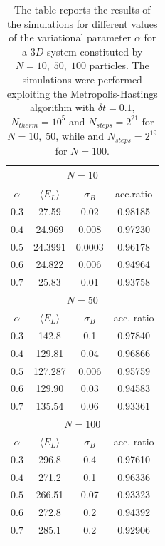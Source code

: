 \begin{table}[H]
    \centering
    \begin{tabular}{cccc}
    \toprule
        \multicolumn{4}{c}{$N=10$} \\
        \midrule
        $\alpha$ & $\langle E_L \rangle$ & $\sigma_B$ & acc.ratio \\
        \midrule
        $0.3$ & 27.59 & 0.02 & 0.98185 \\
        $0.4$ & 24.969 & 0.008 & 0.97230 \\
        $0.5$ & 24.3991 & 0.0003 & 0.96178  \\
        $0.6$ & 24.822 & 0.006 & 0.94964 \\
        $0.7$ & 25.83 & 0.01 & 0.93758 \\
        \midrule
        \midrule
        \multicolumn{4}{c}{$N=50$} \\
        \midrule
        $\alpha$ & $\langle E_L \rangle$ & $\sigma_B$ & acc. ratio \\
        \midrule
        $0.3$ & 142.8 & 0.1 & 0.97840 \\
        $0.4$ & 129.81 & 0.04 & 0.96866 \\
        $0.5$ & 127.287 & 0.006 & 0.95759 \\
        $0.6$ & 129.90 & 0.03 & 0.94583 \\
        $0.7$ & 135.54 & 0.06 & 0.93361 \\
        \midrule
        \midrule
        \multicolumn{4}{c}{$N=100$} \\
        \midrule
        $\alpha$ & $\langle E_L \rangle$ & $\sigma_B$ & acc. ratio \\
        \midrule
        $0.3$ & 296.8 & 0.4 & 0.97610 \\
        $0.4$ & 271.2 & 0.1 & 0.96336 \\
        $0.5$ & 266.51 & 0.07 &  0.93323\\
        $0.6$ & 272.8 & 0.2 &   0.94392\\
        $0.7$ & 285.1 & 0.2 &  0.92906\\
        \bottomrule
    \end{tabular}
    \caption{The table reports the results of the simulations for different values of the variational parameter $\alpha$ for a $3D$ system constituted by $N=10,\;50,\;100$ particles. The simulations were performed exploiting the Metropolis-Hastings algorithm with $\delta t=0.1$, $N_{therm}=10^5$ and $N_{steps}=2^{21}$ for $N=10,\;50$, while and $N_{steps}=2^{19}$ for $N=100$. }
    \label{tab:varying_alpha_interacting}
\end{table}


